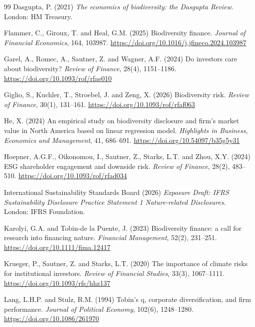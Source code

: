 \documentclass[12pt,a4paper]{article}
\begin{document}
\begin{thebibliography}{99}
 Dasgupta, P. (2021) \emph{The economics of biodiversity: the Dasgupta Review}. London: HM Treasury.

 Flammer, C., Giroux, T. and Heal, G.M. (2025) Biodiversity finance. \emph{Journal of Financial Economics}, 164, 103987. \url{https://doi.org/10.1016/j.jfineco.2024.103987}

 Garel, A., Romec, A., Sautner, Z. and Wagner, A.F. (2024) Do investors care about biodiversity? \emph{Review of Finance}, 28(4), 1151--1186. \url{https://doi.org/10.1093/rof/rfae010}

 Giglio, S., Kuchler, T., Stroebel, J. and Zeng, X. (2026) Biodiversity risk. \emph{Review of Finance}, 30(1), 131--161. \url{https://doi.org/10.1093/rof/rfaf063}

 He, X. (2024) An empirical study on biodiversity disclosure and firm's market value in North America based on linear regression model. \emph{Highlights in Business, Economics and Management}, 41, 686--691. \url{https://doi.org/10.54097/b35g5y31}

 Hoepner, A.G.F., Oikonomou, I., Sautner, Z., Starks, L.T. and Zhou, X.Y. (2024) ESG shareholder engagement and downside risk. \emph{Review of Finance}, 28(2), 483--510. \url{https://doi.org/10.1093/rof/rfad034}

 International Sustainability Standards Board (2026) \emph{Exposure Draft: IFRS Sustainability Disclosure Practice Statement 1 Nature-related Disclosures}. London: IFRS Foundation.

 Karolyi, G.A. and Tobin-de la Puente, J. (2023) Biodiversity finance: a call for research into financing nature. \emph{Financial Management}, 52(2), 231--251. \url{https://doi.org/10.1111/fima.12417}

 Krueger, P., Sautner, Z. and Starks, L.T. (2020) The importance of climate risks for institutional investors. \emph{Review of Financial Studies}, 33(3), 1067--1111. \url{https://doi.org/10.1093/rfs/hhz137}

 Lang, L.H.P. and Stulz, R.M. (1994) Tobin's q, corporate diversification, and firm performance. \emph{Journal of Political Economy}, 102(6), 1248--1280. \url{https://doi.org/10.1086/261970}


\end{thebibliography}
\end{document}
